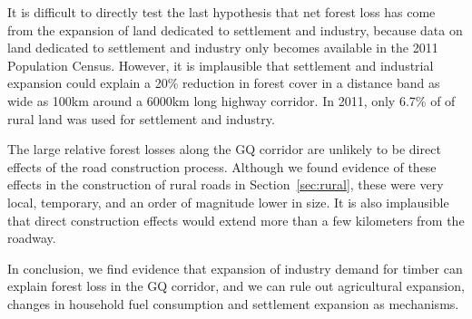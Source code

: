 It is difficult to directly test the last hypothesis that net forest
loss has come from the expansion of land dedicated to settlement and
industry, because data on land dedicated to settlement and industry
only becomes available in the 2011 Population Census. However, it is
implausible that settlement and industrial expansion could explain a
20\% reduction in forest cover in a distance band as wide as 100km
around a 6000km long highway corridor. In 2011, only 6.7\% of of rural
land was used for settlement and industry.

The large relative forest losses along the GQ corridor are unlikely to
be direct effects of the road construction process. Although we found
evidence of these effects in the construction of rural roads in
Section~\ref{sec:rural}, these were very local, temporary, and an
order of magnitude lower in size. It is also implausible that direct
construction effects would extend more than a few kilometers from the
roadway.

In conclusion, we find evidence that expansion of industry
demand for timber can explain forest loss in the GQ corridor, and we
can rule out agricultural expansion, changes in household fuel
consumption and settlement expansion as mechanisms.
